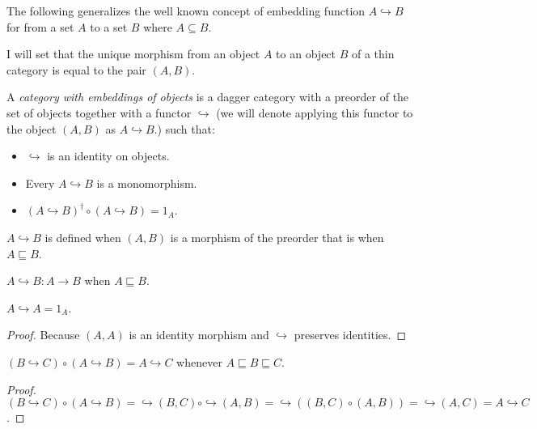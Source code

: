 The following generalizes the well known concept of embedding function $A
\hookrightarrow B$ for from a set $A$ to a set $B$ where $A \subseteq B$.

I will set that the unique morphism from an object $A$ to an object $B$ of a
thin category is equal to the pair $(A , B)$.

\begin{defn}
  A \emph{category with embeddings of objects} is a dagger category with a
  preorder of the set of objects together with a functor $\hookrightarrow$ (we
  will denote applying this functor to the object $(A , B)$ as $A
  \hookrightarrow B$.) such that:
  \begin{itemize}
    \item $\hookrightarrow$ is an identity on objects.
    
    \item Every $A \hookrightarrow B$ is a monomorphism.
    
    \item $(A \hookrightarrow B)^{\dagger} \circ (A \hookrightarrow B) = 1_A$.
  \end{itemize}
\end{defn}

\begin{obvious}
$A\hookrightarrow B$ is defined when $(A , B)$ is a morphism of the preorder
that is when $A \sqsubseteq B$.
\end{obvious}

\begin{obvious}
$A \hookrightarrow B : A \rightarrow B$ when $A \sqsubseteq B$.
\end{obvious}

\begin{prop}
  $A \hookrightarrow A = 1_A$.
\end{prop}

\begin{proof}
  Because $(A , A)$ is an identity morphism and $\hookrightarrow$ preserves
  identities.
\end{proof}

\begin{prop}
  $(B \hookrightarrow C) \circ (A \hookrightarrow B) = A \hookrightarrow C$
  whenever $A \sqsubseteq B \sqsubseteq C$.
\end{prop}

\begin{proof}
  $(B \hookrightarrow C) \circ (A \hookrightarrow B) = \hookrightarrow (B , C)
  \circ \hookrightarrow (A , B) = \hookrightarrow ((B , C) \circ (A , B)) =
  \hookrightarrow (A , C) = A \hookrightarrow C$.
\end{proof}

